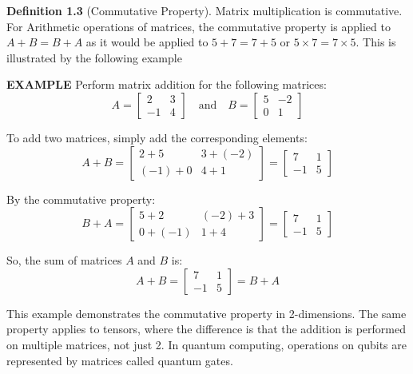 \documentclass{report}
\begin{document}
\noindent \textbf{Definition 1.3} (Commutative Property).
Matrix multiplication is commutative. For Arithmetic operations of matrices, the commutative property is applied to $A + B = B + A$ as it would be applied to $5 + 7 = 7 + 5$ or $5 \times 7 = 7 \times 5$. This is illustrated by the following example
\begin{tcolorbox}[colback=gray!10, boxrule=0pt]
    \textbf{EXAMPLE}
    Perform matrix addition for the following matrices:
    \[
    A = \begin{bmatrix}
    2 & 3 \\
    -1 & 4
    \end{bmatrix}
    \quad \text{and} \quad
    B = \begin{bmatrix}
    5 & -2 \\
    0 & 1
    \end{bmatrix}
    \]
    
    To add two matrices, simply add the corresponding elements:
    \[
    A + B = \begin{bmatrix}
    2 + 5 & 3 + (-2) \\
    (-1) + 0 & 4 + 1
    \end{bmatrix}
    = \begin{bmatrix}
    7 & 1 \\
    -1 & 5
    \end{bmatrix}
    \]
    
    By the commutative property:
    \[
    B + A = \begin{bmatrix}
    5 + 2 & (-2) + 3 \\
    0 + (-1) & 1 + 4
    \end{bmatrix}
    =  \begin{bmatrix}
    7 & 1 \\
    -1 & 5
    \end{bmatrix}
    \]
    
    So, the sum of matrices \(A\) and \(B\) is:
    \[
    A + B = \begin{bmatrix}
    7 & 1 \\
    -1 & 5
    \end{bmatrix} = B + A
    \]
\end{tcolorbox}
\noindent This example demonstrates the commutative property in 2-dimensions. The same property applies to tensors, where the difference is that the addition is performed on multiple matrices, not just 2. In quantum computing, operations on qubits are represented by matrices called quantum gates. \\
\end{document}
